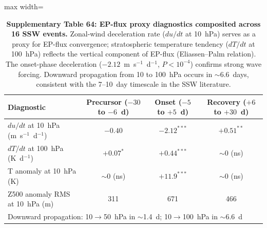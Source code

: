 \documentclass[11pt,letterpaper]{article}
\begin{document}
\begin{table}[!ht]
\centering
\caption{\textbf{Supplementary Table 64: EP-flux proxy diagnostics composited across 16 SSW events.}
Zonal-wind deceleration rate ($du/dt$ at 10~hPa) serves as a proxy for EP-flux convergence; stratospheric temperature tendency ($dT/dt$ at 100~hPa) reflects the vertical component of EP-flux (Eliassen--Palm relation). The onset-phase deceleration ($-2.12$~m~s$^{-1}$~d$^{-1}$, $P < 10^{-4}$) confirms strong wave forcing. Downward propagation from 10 to 100~hPa occurs in $\sim$6.6~days, consistent with the 7--10~day timescale in the SSW literature.}
\label{tab:epflux_diag}
\small
\begin{adjustbox}{max width=\textwidth}
\begin{tabular}{lccc}
\toprule
Diagnostic & Precursor ($-30$ to $-6$~d) & Onset ($-5$ to $+5$~d) & Recovery ($+6$ to $+30$~d) \\
\midrule
$du/dt$ at 10~hPa (m~s$^{-1}$~d$^{-1}$) & $-0.40$ & $-2.12^{***}$ & $+0.51^{**}$ \\
$dT/dt$ at 100~hPa (K~d$^{-1}$) & $+0.07^{*}$ & $+0.44^{***}$ & $\sim 0$ (ns) \\
T anomaly at 10~hPa (K) & $\sim 0$ (ns) & $+11.9^{***}$ & $\sim 0$ (ns) \\
Z500 anomaly RMS at 10~hPa (m) & 311 & 671 & 466 \\
\midrule
\multicolumn{4}{l}{Downward propagation: 10$\to$50~hPa in $\sim$1.4~d; 10$\to$100~hPa in $\sim$6.6~d} \\
\bottomrule
\end{tabular}
\end{adjustbox}
\end{table}
\end{document}
